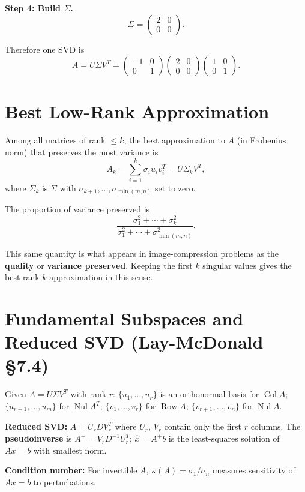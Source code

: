 \textbf{Step 4: Build $\Sigma$.}
\[
\Sigma=\begin{pmatrix}
2 & 0\\
0 & 0
\end{pmatrix}.
\]

Therefore one SVD is
\[
\boxed{
A=U\Sigma V^T
=
\begin{pmatrix}
-1 & 0\\
0 & 1
\end{pmatrix}
\begin{pmatrix}
2 & 0\\
0 & 0
\end{pmatrix}
\begin{pmatrix}
1 & 0\\
0 & 1
\end{pmatrix}.
}
\]

\section{Best Low-Rank Approximation}

\begin{theorem}
Among all matrices of rank $\leq k$, the best approximation to $A$ (in Frobenius norm) that preserves the most variance is
\[
A_k = \sum_{i=1}^k \sigma_i\bar{u}_i\bar{v}_i^T = U\Sigma_k V^T,
\]
where $\Sigma_k$ is $\Sigma$ with $\sigma_{k+1},\ldots,\sigma_{\min(m,n)}$ set to zero.
\end{theorem}

The proportion of variance preserved is
\[
\frac{\sigma_1^2+\cdots+\sigma_k^2}{\sigma_1^2+\cdots+\sigma_{\min(m,n)}^2}.
\]

\begin{remark}
This same quantity is what appears in image-compression problems as the \textbf{quality} or \textbf{variance preserved}. Keeping the first $k$ singular values gives the best rank-$k$ approximation in this sense.
\end{remark}

\section{Fundamental Subspaces and Reduced SVD (Lay-McDonald \S7.4)}

Given $A=U\Sigma V^T$ with rank $r$: $\{u_1,\ldots,u_r\}$ is an orthonormal basis for $\operatorname{Col} A$; $\{u_{r+1},\ldots,u_m\}$ for $\operatorname{Nul} A^T$; $\{v_1,\ldots,v_r\}$ for $\operatorname{Row} A$; $\{v_{r+1},\ldots,v_n\}$ for $\operatorname{Nul} A$.

\textbf{Reduced SVD:} $A=U_r D V_r^T$ where $U_r$, $V_r$ contain only the first $r$ columns. The \textbf{pseudoinverse} is $A^+=V_r D^{-1} U_r^T$; $\hat{x}=A^+ b$ is the least-squares solution of $Ax=b$ with smallest norm.

\textbf{Condition number:} For invertible $A$, $\kappa(A)=\sigma_1/\sigma_n$ measures sensitivity of $Ax=b$ to perturbations.
